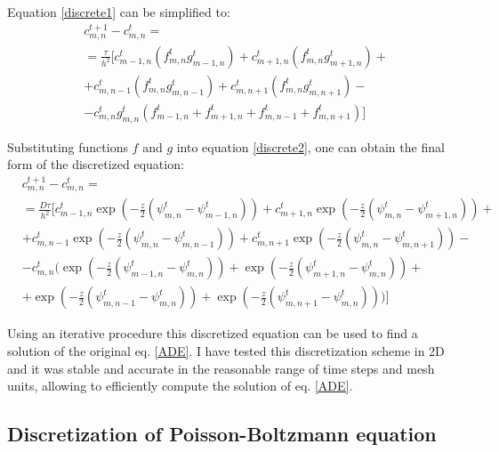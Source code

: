 Equation \eqref{discrete1} can be simplified to:
\begin{align}
\label{discrete2}
&c_{m,n}^{t+1} - c_{m,n}^{t} = \nonumber \\
&= \frac{\tau}{h^2} \bigg[ c_{m-1,n}^{t} (f_{m,n}^{t} g_{m-1,n}^{t})  + c_{m+1,n}^{t} (f_{m,n}^{t} g_{m+1,n}^{t}) + \nonumber \\ 
&+ c_{m,n-1}^{t}(f_{m,n}^{t} g_{m,n-1}^{t}) + c_{m,n+1}^{t} (f_{m,n}^{t} g_{m,n+1}^{t})  - \nonumber \\
&- c_{m,n}^{t} g_{m,n}^{t} (f_{m-1,n}^{t} + f_{m+1,n}^{t} + f_{m,n-1}^{t} + f_{m,n+1}^{t}) \bigg]
\end{align}


Substituting functions $f$ and $g$ into equation \eqref{discrete2}, one can obtain the final form of the discretized equation: 
\begin{align}
\label{discrete_final}
&c_{m,n}^{t+1} - c_{m,n}^{t} = \nonumber \\
&= \frac{D\tau}{h^2} \bigg[ c_{m-1,n}^{t} \exp(-\frac{z}{2}(\psi_{m,n}^{t} - \psi_{m-1,n}^{t}))  + c_{m+1,n}^{t} \exp(-\frac{z}{2}(\psi_{m,n}^{t} - \psi_{m+1,n}^{t})) + \nonumber \\ 
&+ c_{m,n-1}^{t} \exp(-\frac{z}{2}(\psi_{m,n}^{t} - \psi_{m,n-1}^{t})) + c_{m,n+1}^{t} \exp(-\frac{z}{2}(\psi_{m,n}^{t} - \psi_{m,n+1}^{t}))  - \nonumber \\
&- c_{m,n}^{t} \bigg(\exp(-\frac{z}{2}(\psi_{m-1,n}^{t} - \psi_{m,n}^{t})) + \exp(-\frac{z}{2}(\psi_{m+1,n}^{t} - \psi_{m,n}^{t})) + \nonumber \\ 
&+ \exp(-\frac{z}{2}(\psi_{m,n-1}^{t} - \psi_{m,n}^{t})) + \exp(-\frac{z}{2}(\psi_{m,n+1}^{t} - \psi_{m,n}^{t}))\bigg) \bigg]
\end{align}

Using an iterative procedure this discretized equation can be used to find a solution of the original eq. \eqref{ADE}. I have tested this discretization scheme in 2D and it was stable and accurate in the reasonable range of time steps and mesh units, allowing to efficiently compute the solution of eq. \eqref{ADE}.

\subsection{Discretization of Poisson-Boltzmann equation}

